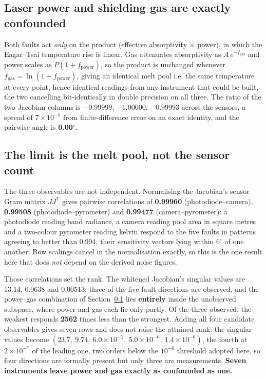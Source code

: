 \documentclass[final,5p,times,twocolumn]{elsarticle}
\begin{document}
\subsection{Laser power and shielding gas are exactly confounded}
\label{sec:confound}

Both faults act \emph{only} on the product (effective absorptivity $\times$
power), in which the Eagar--Tsai temperature rise is linear. Gas attenuates
absorptivity as $A\,e^{-f_{\mathrm{gas}}}$ and power scales as
$P(1+f_{\mathrm{power}})$, so the product is unchanged whenever
$f_{\mathrm{gas}}=\ln(1+f_{\mathrm{power}})$, giving an identical melt pool i.e.
the same temperature at every point, hence identical readings from any instrument
that could be built, the two cancelling bit-identically in double precision on
all three. The
ratio of the two Jacobian columns is $-0.99999$, $-1.00000$, $-0.99993$ across
the sensors, a spread of $7\times10^{-5}$ from finite-difference error on an
exact identity, and the pairwise angle is \textbf{0.00$^\circ$}.

\subsection{The limit is the melt pool, not the sensor count}
\label{sec:melt}

The three observables are not independent. Normalising the Jacobian's sensor Gram
matrix $JJ^{\mathsf T}$ gives pairwise correlations of \textbf{0.99960}
(photodiode--camera), \textbf{0.99508} (photodiode--pyrometer) and
\textbf{0.99477} (camera--pyrometer): a photodiode reading band radiance, a
camera reading pool area in square metres and a two-colour pyrometer reading
kelvin respond to the five faults in patterns agreeing to better than 0.994, their sensitivity vectors lying within $6^\circ$ of one another. Row scalings cancel in the normalisation exactly, so this is the one result here that does
\emph{not} depend on the derived noise figures.

Those correlations set the rank. The whitened Jacobian's singular values are
13.14, 0.0638 and 0.00513: three of the five fault directions are observed, and
the power--gas combination of Section~\ref{sec:confound} lies \textbf{entirely}
inside the unobserved subspace, where power and gas each lie only partly. Of the
three observed, the weakest responds \textbf{2562} times less than the strongest. Adding all four
candidate observables gives seven rows and does not raise the attained rank:
the singular values become $(23.7,\ 9.74,\ 6.0\times10^{-2},\ 5.0\times10^{-6},\
1.4\times10^{-6})$, the fourth at $2\times10^{-7}$ of the leading one, two orders
below the $10^{-6}$ threshold adopted here, so four directions are formally
present but only three are measurements. \textbf{Seven instruments leave power
and gas exactly as confounded as one.}
\end{document}
